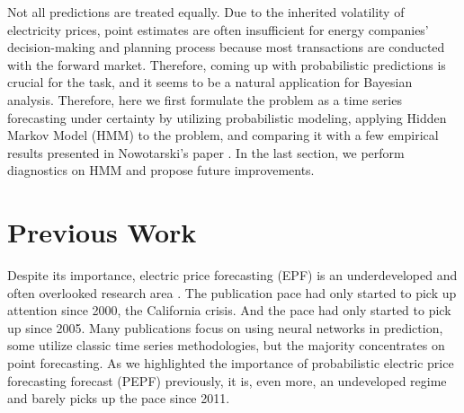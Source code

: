 \documentclass[11pt, letterpaper, journal]{IEEEtran}
\begin{document}
Not all predictions are treated equally. Due to the inherited volatility of electricity prices, point estimates are often insufficient for energy companies' decision-making and planning process because most transactions are conducted with the forward market. Therefore, coming up with probabilistic predictions is crucial for the task, and it seems to be a natural application for Bayesian analysis. Therefore, here we first formulate the problem as a time series forecasting under certainty by utilizing probabilistic modeling, applying Hidden Markov Model (HMM) to the problem, and comparing it with a few empirical results presented in Nowotarski's paper \cite{NOWOTARSKI20181548}. In the last section, we perform diagnostics on HMM and propose future improvements.


\section{Previous Work}
Despite its importance, electric price forecasting (EPF) is an underdeveloped and often overlooked research area \cite{NOWOTARSKI20181548}. The publication pace had only started to pick up attention since 2000, the California crisis. And the pace had only started to pick up since 2005. Many publications focus on using neural networks in prediction, some utilize classic time series methodologies, but the majority concentrates on point forecasting. As we highlighted the importance of probabilistic electric price forecasting forecast (PEPF) previously, it is, even more, an undeveloped regime and barely picks up the pace since 2011.
\end{document}
